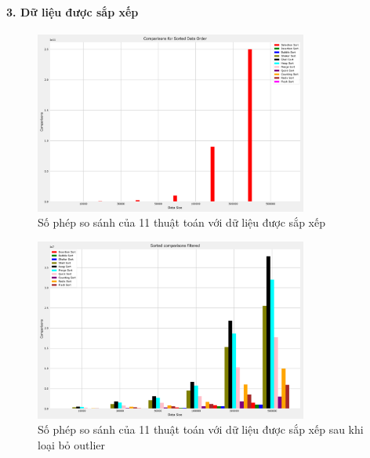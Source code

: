 \paragraph{3. Dữ liệu được sắp xếp}
\begin{figure}[H]
    \centering
    \includegraphics[width=0.8\textwidth]{exprimental_result/images/sorted_comparisons.png}
    \caption{Số phép so sánh của 11 thuật toán với dữ liệu được sắp xếp}
\end{figure}

\begin{figure}[H]
    \centering
    \includegraphics[width=0.8\textwidth]{exprimental_result/images/sorted_comparisons_filtered.png}
    \caption{Số phép so sánh của 11 thuật toán với dữ liệu được sắp xếp sau khi loại bỏ outlier}
\end{figure}





